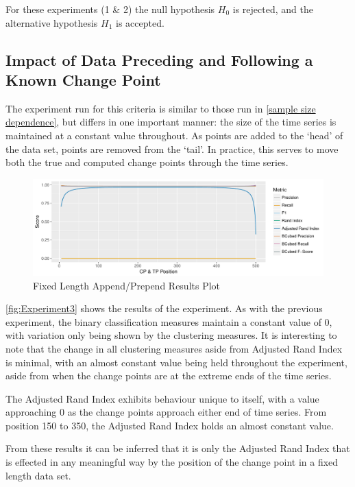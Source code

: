 \documentclass[../main.tex]{subfiles}
\begin{document}
For these experiments (1 \& 2) the null hypothesis $H_0$ is rejected, and the alternative hypothesis $H_1$ is accepted.

\subsection{Impact of Data Preceding and Following a Known Change Point}

The experiment run for this criteria is similar to those run in \autoref{sample size dependence}, but differs in one important manner: the size of the time series is maintained at a constant value throughout. As points are added to the `head' of the data set, points are removed from the `tail'. In practice, this serves to move both the true and computed change points through the time series.

\begin{figure}[h]
    \includegraphics[width=\textwidth]{figures/Experiment2}
    \caption{Fixed Length Append/Prepend Results Plot}
    \label{fig:Experiment3}
\end{figure}

\autoref{fig:Experiment3} shows the results of the experiment. As with the previous experiment, the binary classification measures maintain a constant value of $0$, with variation only being shown by the clustering measures. It is interesting to note that the change in all clustering measures aside from Adjusted Rand Index is minimal, with an almost constant value being held throughout the experiment, aside from when the change points are at the extreme ends of the time series.

The Adjusted Rand Index exhibits behaviour unique to itself, with a value approaching 0 as the change points approach either end of time series. From position 150 to 350, the Adjusted Rand Index holds an almost constant value.

From these results it can be inferred that it is only the Adjusted Rand Index that is effected in any meaningful way by the position of the change point in a fixed length data set.
\end{document}
